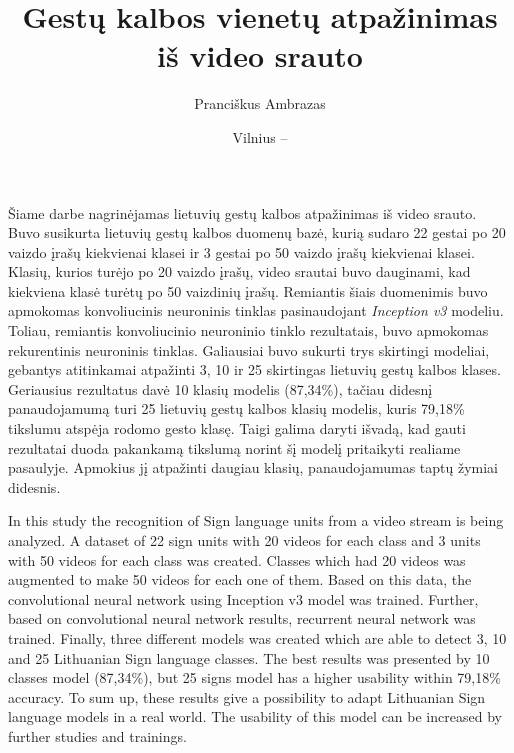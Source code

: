 \documentclass{VUMIFPSbakalaurinis}
\title{Gestų kalbos vienetų atpažinimas iš video srauto}
\author{Pranciškus Ambrazas}
\date{Vilnius – \the\year}
\begin{document}
\maketitle



Šiame darbe nagrinėjamas lietuvių gestų kalbos atpažinimas iš video srauto. Buvo susikurta lietuvių gestų kalbos duomenų bazė, kurią sudaro 22 gestai po 20 vaizdo įrašų kiekvienai klasei ir 3 gestai po 50 vaizdo įrašų kiekvienai klasei. Klasių, kurios turėjo po 20 vaizdo įrašų, video srautai buvo dauginami, kad kiekviena klasė turėtų po 50 vaizdinių įrašų. Remiantis šiais duomenimis buvo apmokomas konvoliucinis neuroninis tinklas pasinaudojant \textit{Inception v3} modeliu. Toliau, remiantis konvoliucinio neuroninio tinklo rezultatais, buvo apmokomas rekurentinis neuroninis tinklas. Galiausiai buvo sukurti trys skirtingi modeliai, gebantys atitinkamai atpažinti 3, 10 ir 25 skirtingas lietuvių gestų kalbos klases. Geriausius rezultatus davė 10 klasių modelis (87,34\%), tačiau didesnį panaudojamumą turi 25 lietuvių gestų kalbos klasių modelis, kuris 79,18\% tikslumu atspėja rodomo gesto klasę. Taigi galima daryti išvadą, kad gauti rezultatai duoda pakankamą tikslumą norint šį modelį pritaikyti realiame pasaulyje. Apmokius jį atpažinti daugiau klasių, panaudojamumas taptų žymiai didesnis.



In this study the recognition of Sign language units from a video stream is being analyzed. A dataset of 22 sign units with 20 videos for each class and 3 units with 50 videos for each class was created. Classes which had 20 videos was augmented to make 50 videos for each one of them. Based on this data, the convolutional neural network using Inception v3 model was trained. Further, based on convolutional neural network results, recurrent neural network was trained. Finally, three different models was created which are able to detect 3, 10 and 25 Lithuanian Sign language classes. The best results was presented by 10 classes model (87,34\%), but 25 signs model has a higher usability within 79,18\% accuracy. To sum up, these results give a possibility to adapt Lithuanian Sign language models in a real world. The usability of this model can be increased by further studies and trainings.
\end{document}

